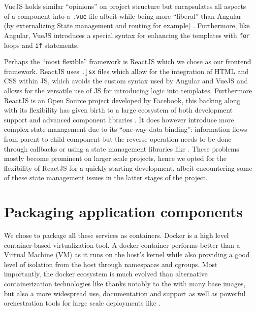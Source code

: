\documentclass[\version]{l4proj}
\begin{document}
VueJS holds similar ``opinions'' on project structure but encapsulates all aspects of a component into a \lstinline{.vue} file albeit while being more ``liberal'' than Angular (by externalizing State management and routing for example) \autocite{wohlgethanSupportingWebDevelopmentDecisions2018}.
Furthermore, like Angular, VueJS introduces a special syntax for enhancing the templates with \lstinline{for} loops and \lstinline{if} statements.

Perhaps the ``most flexible'' framework is ReactJS which we chose as our frontend framework.
ReactJS uses \lstinline{.jsx} files which allow for the integration of HTML and CSS within JS, which avoids the custom syntax used by Angular and VueJS and allows for the versatile use of JS for introducing logic into templates.
Furthermore ReactJS is an Open Source project developed by Facebook, this backing along with its flexibility has given birth to a large ecosystem of both development support and advanced component libraries \autocite{wohlgethanSupportingWebDevelopmentDecisions2018}.
It does however introduce more complex state management due to its ``one-way data binding'': information flows from parent to child component but the reverse operation needs to be done through callbacks or using a state management libraries like \textcite{Redux2020}.
These problems mostly become prominent on larger scale projects, hence we opted for the flexibility of ReactJS for a quickly starting development, albeit encountering some of these state management issues in the latter stages of the project.

\section{Packaging application components}

We chose to package all these services as \textcite{Docker2020} containers.
Docker is a high level container-based virtualization tool.
A docker container performs better than a Virtual Machine (VM) as it runs on the host's kernel while also providing a good level of isolation from the host through namespaces and cgroups.
Most importantly, the docker ecosystem is much evolved than alternative containerization technologies like \textcite{Lxc2020} thanks notably to the \textcite{DockerHub} with many base images, but also a more widespread use, documentation and support as well as powerful orchestration tools for large scale deployments like \textcite{Kubernetes2020}.
\end{document}
